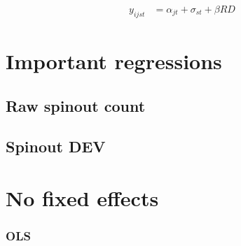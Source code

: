 \documentclass[12pt,english]{article}
\theoremstyle{remark}
\begin{document}
\begin{align*}
	y_{ijst} &= \alpha_{jt} + \sigma_{st} + \beta RD 
\end{align*}

\section{Important regressions}

\subsection{Raw spinout count}


\linebreak

\subsection{Spinout DEV}


\linebreak


\section{No fixed effects}



\subsubsection{OLS}

\linebreak

\linebreak

\linebreak

\linebreak

\linebreak

\linebreak

\linebreak

\linebreak

\linebreak

\end{document}
